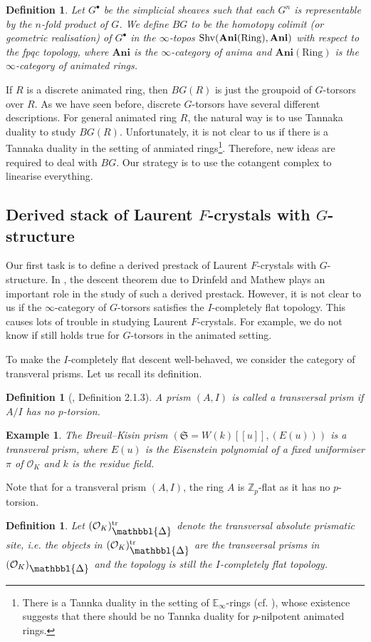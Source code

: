 \documentclass[10pt]{article}
\newtheorem{exam}[thm]{Example}
\newtheorem{dfn}[thm]{Definition}
\numberwithin{equation}{section}
\newcommand{\frakS}{{\mathfrak S}}
\newcommand{\bE}{{\mathbb E}}
\newcommand{\bZ}{{\mathbb Z}}
\newcommand{\calO}{{\mathcal O}}
\newcommand{\Ring}{\mathrm{Ring}}
\newcommand{\Prism}{{\mathlarger{\mathbbl{\Delta}}}} %
\newcommand{\bfAni}{\textbf{Ani}}
\begin{document}
\begin{dfn}\label{BG}
    Let $G^{\bullet}$ be the simplicial sheaves such that each $G^n$ is representable by the $n$-fold product of $G$. We define $BG$ to be the homotopy colimit (or geometric realisation) of $G^{\bullet}$ in the $\infty$-topos ${\rm Shv}(\bfAni(\Ring),\bfAni)$ with respect to the fpqc topology, where $\bfAni$ is the $\infty$-category of anima and $\bfAni(\Ring)$ is the $\infty$-category of animated rings.
\end{dfn}
If $R$ is a discrete animated ring, then $BG(R)$ is just the groupoid of $G$-torsors over $R$. As we have seen before, discrete $G$-torsors have several different descriptions. For general animated ring $R$, the natural way is to use Tannaka duality to study $BG(R)$. Unfortunately, it is not clear to us if there is a Tannaka duality in the setting of anmiated rings\footnote{There is a Tannka duality in the setting of $\bE_{\infty}$-rings (cf. \cite[Corollary 9.3.7.3]{Lur18}), whose existence suggests that there should be no Tannka duality for $p$-nilpotent animated rings.}. Therefore, new ideas are required to deal with $BG$. Our strategy is to use the cotangent complex to linearise everything.


\subsection{Derived stack of Laurent $F$-crystals with $G$-structure}
Our first task is to define a derived prestack of Laurent $F$-crystals with $G$-structure. In \cite{Min23}, the descent theorem \cite[Theorem 2.4]{Min23} due to Drinfeld and Mathew plays an important role in the study of such a derived prestack. However, it is not clear to us if the $\infty$-category of $G$-torsors satisfies the $I$-completely flat topology. This causes lots of trouble in studying Laurent $F$-crystals. For example, we do not know if \cite[Proposition 2.7]{BS23} still holds true for $G$-torsors in the animated setting.

To make the $I$-completely flat descent well-behaved, we consider the category of transveral prisms. Let us recall its definition.
\begin{dfn}[\cite{BL22}, Definition 2.1.3]
    A prism $(A,I)$ is called a transversal prism if $A/I$ has no $p$-torsion.
\end{dfn}
\begin{exam}
    The Breuil--Kisin prism $(\frakS=W(k)[[u]],(E(u)))$ is a transveral prism, where $E(u)$ is the Eisenstein polynomial of a fixed uniformiser $\pi$ of $\calO_K$ and $k$ is the residue field.
\end{exam}
Note that for a transveral prism $(A,I)$, the ring $A$ is $\bZ_p$-flat as it has no $p$-torsion. 
\begin{dfn}
    Let $(\calO_K)_{\Prism}^{\rm tr}$ denote the transversal absolute prismatic site, i.e. the objects in $(\calO_K)_{\Prism}^{\rm tr}$ are the transversal prisms in $(\calO_K)_{\Prism}$ and the topology is still the $I$-completely flat topology.
\end{dfn}
\end{document}
